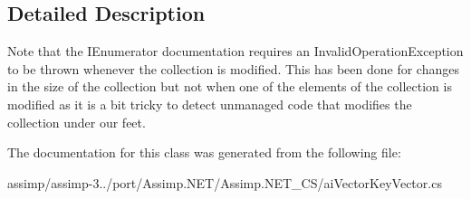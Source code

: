 \subsection{Detailed Description}
Note that the I\+Enumerator documentation requires an Invalid\+Operation\+Exception to be thrown whenever the collection is modified. This has been done for changes in the size of the collection but not when one of the elements of the collection is modified as it is a bit tricky to detect unmanaged code that modifies the collection under our feet. 

The documentation for this class was generated from the following file\+:\begin{DoxyCompactItemize}
\item 
assimp/assimp-\/3../port/\+Assimp.\+N\+E\+T/\+Assimp.\+N\+E\+T\+\_\+\+C\+S/ai\+Vector\+Key\+Vector.\+cs\end{DoxyCompactItemize}
